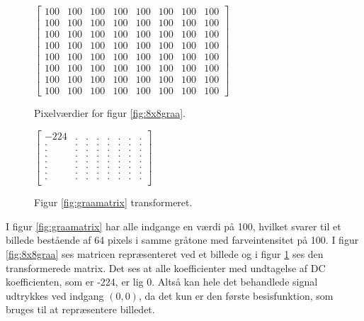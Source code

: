 \begin{figure}[htbp]
\begin{minipage}[b]{0.5\linewidth}
\centering
$\begin{bmatrix}
100	&	100	&	100	&	100	&	100	&	100	&	100	&	100\\
100	&	100	&	100	&	100	&	100	&	100	&	100	&	100\\
100	&	100	&	100	&	100	&	100	&	100	&	100	&	100\\
100	&	100	&	100	&	100	&	100	&	100	&	100	&	100\\
100	&	100	&	100	&	100	&	100	&	100	&	100	&	100\\
100	&	100	&	100	&	100	&	100	&	100	&	100	&	100\\
100	&	100	&	100	&	100	&	100	&	100	&	100	&	100\\
100	&	100	&	100	&	100	&	100	&	100	&	100	&	100
\end{bmatrix}$

\caption{Pixelværdier for figur \ref{fig:8x8graa}.\label{fig:graamatrix}}
\end{minipage}
\hspace{0.5cm}
\begin{minipage}[b]{0.5\linewidth}
\centering
$\begin{bmatrix}
-224		&	.	&	.	&	.	&	.	&	.	&	.	&	.\\
.		&	.	&	.	&	.	&	.	&	.	&	.	&	.\\
.		&	.	&	.	&	.	&	.	&	.	&	.	&	.\\
.		&	.	&	.	&	.	&	.	&	.	&	.	&	.\\
.		&	.	&	.	&	.	&	.	&	.	&	.	&	.\\
.		&	.	&	.	&	.	&	.	&	.	&	.	&	.\\
.		&	.	&	.	&	.	&	.	&	.	&	.	&	.\\
.		&	.	&	.	&	.	&	.	&	.	&	.	&	.\\
\end{bmatrix}
$
\caption{Figur \ref{fig:graamatrix} transformeret.\label{fig:trans_matrix1}}
\end{minipage}
\end{figure}
I figur \ref{fig:graamatrix} har alle indgange en værdi på 100, hvilket svarer til et billede bestående af 64 pixels i samme gråtone med farveintensitet på 100. I figur \ref{fig:8x8graa} ses matricen repræsenteret ved et billede og i figur \ref{fig:trans_matrix1} ses den transformerede matrix. Det ses at alle koefficienter med undtagelse af DC koefficienten, som er -224, er lig 0. Altså kan hele det behandlede signal udtrykkes ved indgang $(0,0)$, da det kun er den første besisfunktion, som bruges til at repræsentere billedet.

